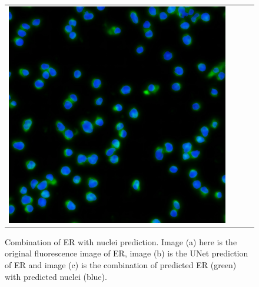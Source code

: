 \begin{figure}[htb]
\begin{tabularx}{\textwidth}{YYYY}
            \includegraphics{bilder/ER/gt_nuclei.jpg}
        \end{tabularx}
    \caption{Combination of ER with nuclei prediction. Image (a) here is the original fluorescence image of ER, image (b) is the UNet prediction of ER and image (c) is the combination of predicted ER (green) with predicted nuclei (blue).}
    \label{fig:er-combined}
\end{figure}